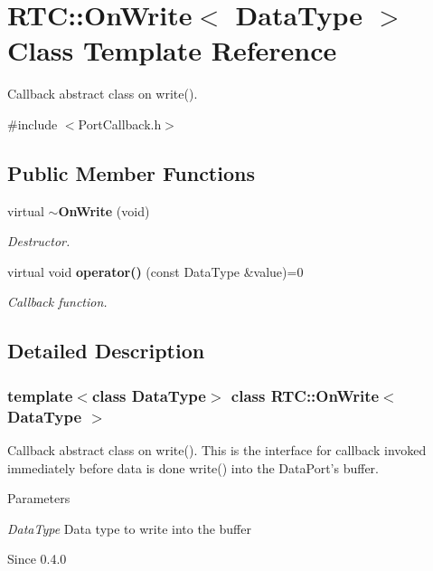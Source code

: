 \section{RTC::OnWrite$<$ DataType $>$ Class Template Reference}
\label{classRTC_1_1OnWrite}


Callback abstract class on write().  




{\ttfamily \#include $<$PortCallback.h$>$}

\subsection*{Public Member Functions}
\begin{DoxyCompactItemize}
\item 
virtual {\bf $\sim$OnWrite} (void)
\begin{DoxyCompactList}\small\item\em Destructor. \item\end{DoxyCompactList}\item 
virtual void {\bf operator()} (const DataType \&value)=0
\begin{DoxyCompactList}\small\item\em Callback function. \item\end{DoxyCompactList}\end{DoxyCompactItemize}


\subsection{Detailed Description}
\subsubsection*{template$<$class DataType$>$ class RTC::OnWrite$<$ DataType $>$}

Callback abstract class on write(). This is the interface for callback invoked immediately before data is done write() into the DataPort's buffer.


\begin{DoxyParams}{Parameters}
\item[{\em DataType}]Data type to write into the buffer\end{DoxyParams}
\begin{DoxySince}{Since}
0.4.0 
\end{DoxySince}


